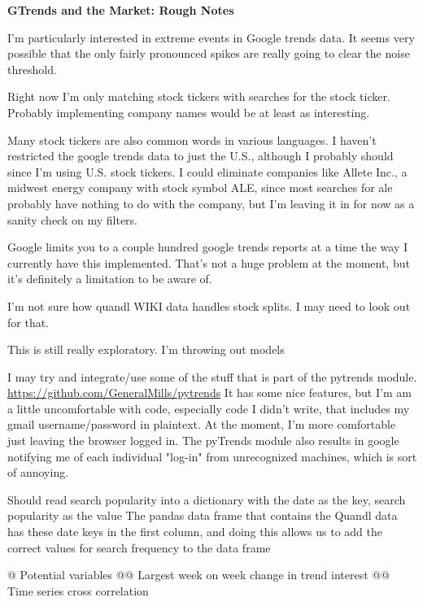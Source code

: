 \documentclass{article}
\begin{document}
\begin{center}{\huge\bf GTrends and the Market: Rough Notes}\end{center}

I'm particularly interested in extreme events in Google trends data. It
seems very possible that the only fairly pronounced spikes are really
going to clear the noise threshold.

Right now I'm only matching stock tickers with searches for the stock ticker.
Probably implementing company names would be at least as interesting.

Many stock tickers are also common words in various languages. I haven't restricted 
the google trends data to just the U.S., although I probably should since I'm using
U.S. stock tickers. I could eliminate companies like Allete Inc., a midwest energy company
with stock symbol ALE, since most searches for ale probably have nothing to do with the company,
but I'm leaving it in for now as a sanity check on my filters. 

Google limits you to a couple hundred google trends reports at a time the way I currently
have this implemented. That's not a huge problem at the moment, but it's definitely a
limitation to be aware of.

I'm not sure how quandl WIKI data handles stock splits. I may need to look 
out for that.

This is still really exploratory. I'm throwing out models

I may try and integrate/use some of the stuff that is part of the pytrends module.
\url{https://github.com/GeneralMills/pytrends}
It has some nice features, but I'm am a little uncomfortable with code, especially
code I didn't write, that includes my gmail username/password in plaintext. 
At the moment, I'm more comfortable just leaving the browser logged in.
The pyTrends module also results in google notifying me of each individual "log-in"
from unrecognized machines, which is sort of annoying.

Should read search popularity into a dictionary with the date as the key, search popularity as the value
The pandas data frame that contains the Quandl data has these date keys in the first column, and doing this allows
us to add the correct values for search frequency to the data frame 


\begin{easylist}
@ Potential variables
@@ Largest week on week change in trend interest
@@ Time series cross correlation
\end{easylist}
\end{document}
